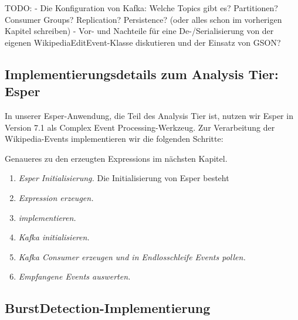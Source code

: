 TODO:
- Die Konfiguration von Kafka: Welche Topics gibt es? Partitionen? Consumer Groups? Replication? Persistence? (oder alles schon im vorherigen Kapitel schreiben)
- Vor- und Nachteile für eine De-/Serialisierung von der eigenen WikipediaEditEvent-Klasse diskutieren und der Einsatz von GSON?

\subsection{Implementierungsdetails zum Analysis Tier: Esper}
In unserer Esper-Anwendung, die Teil des Analysis Tier ist, nutzen wir Esper in Version 7.1 als Complex Event Processing-Werkzeug. Zur Verarbeitung
der Wikipedia-Events implementieren wir die folgenden Schritte:

Genaueres zu den erzeugten Expressions im nächsten Kapitel.

\begin{enumerate}
    \item \textit{Esper Initialisierung.} Die Initialisierung von Esper besteht
    \item \textit{Expression erzeugen.}
    \item \textit{ implementieren.}
    \item \textit{Kafka initialisieren.}
    \item \textit{Kafka Consumer erzeugen und in Endlosschleife Events pollen.}
    \item \textit{Empfangene Events auswerten.}
\end{enumerate}


\subsection{BurstDetection-Implementierung}